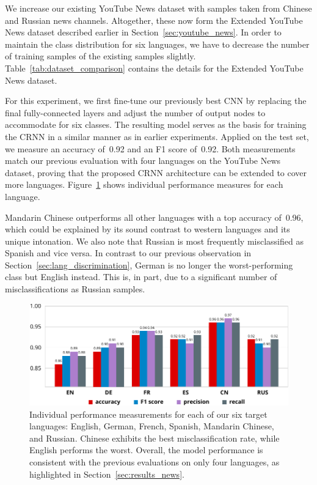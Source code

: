 We increase our existing YouTube News dataset with samples taken from Chinese and Russian news channels. Altogether, these now form the Extended YouTube News dataset described earlier in Section~\ref{sec:youtube_news}. In order to maintain the class distribution for six languages, we have to decrease the number of training samples of the existing samples slightly. Table~\ref{tab:dataset_comparison} contains the details for the Extended YouTube News dataset.

For this experiment, we first fine-tune our previously best CNN by replacing the final fully-connected layers and adjust the number of output nodes to accommodate for six classes. The resulting model serves as the basis for training the CRNN in a similar manner as in earlier experiments. Applied on the test set, we measure an accuracy of~\num{0.92} and an F1 score of~\num{0.92}. Both measurements match our previous evaluation with four languages on the YouTube News dataset, proving that the proposed CRNN architecture can be extended to cover more languages. Figure~\ref{fig:6lang} shows individual performance measures for each language.

Mandarin Chinese outperforms all other languages with a top accuracy of~\num{0.96}, which could be explained by its sound contrast to western languages and its unique intonation. We also note that Russian is most frequently misclassified as Spanish and vice versa. In contrast to our previous observation in Section~\ref{sec:lang_discrimination}, German is no longer the worst-performing class but English instead. This is, in part, due to a significant number of misclassifications as Russian samples.
%
	\begin{figure}[tp]
  		\centering
    	\includegraphics{plots/results_6lang_plot-new.pdf}
    	\caption{Individual performance measurements for each of our six target languages: English, German, French, Spanish, Mandarin Chinese, and Russian. Chinese exhibits the best misclassification rate, while English performs the worst. Overall, the model performance is consistent with the previous evaluations on only four languages, as highlighted in Section~\ref{sec:results_news}.}
    	\label{fig:6lang}
	\end{figure}
%


